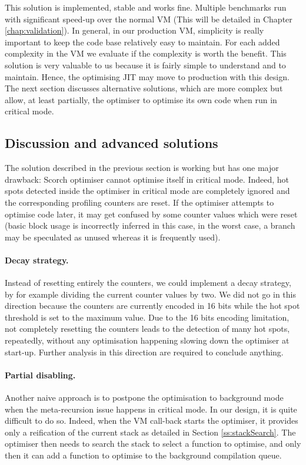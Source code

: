 \documentclass[a4paper,12pt,twoside]{../includes/ThesisStyle}
\begin{document}
This solution is implemented, stable and works fine. Multiple benchmarks run with significant speed-up over the normal VM (This will be detailed in Chapter \ref{chap:validation}). In general, in our production VM, simplicity is really important to keep the code base relatively easy to maintain. For each added complexity in the VM we evaluate if the complexity is worth the benefit. This solution is very valuable to us because it is fairly simple to understand and to maintain. Hence, the optimising JIT may move to production with this design. The next section discusses alternative solutions, which are more complex but allow, at least partially, the optimiser to optimise its own code when run in critical mode.

\subsection{Discussion and advanced solutions}

The solution described in the previous section is working but has one major drawback: Scorch optimiser cannot optimise itself in critical mode. Indeed, hot spots detected inside the optimiser in critical mode are completely ignored and the corresponding profiling counters are reset. If the optimiser attempts to optimise code later, it may get confused by some counter values which were reset (basic block usage is incorrectly inferred in this case, in the worst case, a branch may be speculated as unused whereas it is frequently used). 

\paragraph{Decay strategy.} Instead of resetting entirely the counters, we could implement a decay strategy, by for example dividing the current counter values by two. We did not go in this direction because the counters are currently encoded in 16 bits while the hot spot threshold is set to the maximum value. Due to the 16 bits encoding limitation, not completely resetting the counters leads to the detection of many hot spots, repeatedly, without any optimisation happening slowing down the optimiser at start-up. Further analysis in this direction are required to conclude anything.

\paragraph{Partial disabling.} \label{par:PartialDisabing} Another naive approach is to postpone the optimisation to background mode when the meta-recursion issue happens in critical mode. In our design, it is quite difficult to do so. Indeed, when the VM call-back starts the optimiser, it provides only a reification of the current stack as detailed in Section \ref{ss:stackSearch}. The optimiser then needs to search the stack to select a function to optimise, and only then it can add a function to optimise to the background compilation queue. 
\end{document}

